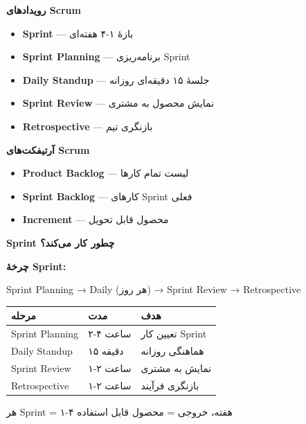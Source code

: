 \documentclass[14pt, a4paper, landscape]{extarticle}
\newcommand{\slide}[1]{%
    \newpage
    \begin{center}
    \begin{minipage}[t]{0.95\textwidth}
    \vspace{0.5cm}
    #1
    \vspace{0.5cm}
    \end{minipage}
    \end{center}
}
\newcommand{\slidetitle}[1]{%
    \begin{center}
        {\LARGE\bfseries\textcolor{primary}{#1}}
    \end{center}
    \vspace{0.5cm}
}
\newcommand{\myaccent}[1]{\textcolor{accent}{#1}}
\begin{document}
\slide{
    \slidetitle{رویدادهای Scrum}
    \vspace{0.5cm}
    \begin{itemize}[itemsep=0.6em]
        \item {\large\textbf{Sprint} — بازهٔ ۱-۴ هفته‌ای}
        \item {\large\textbf{Sprint Planning} — برنامه‌ریزی Sprint}
        \item {\large\textbf{Daily Standup} — جلسهٔ ۱۵ دقیقه‌ای روزانه}
        \item {\large\textbf{Sprint Review} — نمایش محصول به مشتری}
        \item {\large\textbf{Retrospective} — بازنگری تیم}
    \end{itemize}
}

\slide{
    \slidetitle{آرتیفکت‌های Scrum}
    \vspace{0.5cm}
    \begin{itemize}[itemsep=0.8em]
        \item {\large\textbf{Product Backlog} — لیست تمام کارها}
        \vspace{0.3cm}
        \item {\large\textbf{Sprint Backlog} — کارهای Sprint فعلی}
        \vspace{0.3cm}
        \item {\large\textbf{Increment} — محصول قابل تحویل}
    \end{itemize}
}

\slide{
    \slidetitle{Sprint چطور کار می‌کند؟}
    \vspace{0.3cm}
    \begin{center}
        {\large\bfseries چرخهٔ Sprint:}
    \end{center}
    \vspace{0.3cm}
    \begin{center}
        {\large Sprint Planning → Daily (هر روز) → Sprint Review → Retrospective}
    \end{center}
    \vspace{0.5cm}
    \begin{center}
        \begin{tabular}{lp{3.5cm}p{6cm}}
            \toprule
            \textbf{مرحله} & \textbf{مدت} & \textbf{هدف} \\
            \midrule
            Sprint Planning & ۲-۴ ساعت & تعیین کار Sprint \\
            \hline
            Daily Standup & ۱۵ دقیقه & هماهنگی روزانه \\
            \hline
            Sprint Review & ۱-۲ ساعت & نمایش به مشتری \\
            \hline
            Retrospective & ۱-۲ ساعت & بازنگری فرآیند \\
            \bottomrule
        \end{tabular}
    \end{center}
    \vspace{0.5cm}
    \begin{center}
        {\myaccent{هر Sprint = ۱-۴ هفته، خروجی = محصول قابل استفاده}}
    \end{center}
}
\end{document}
